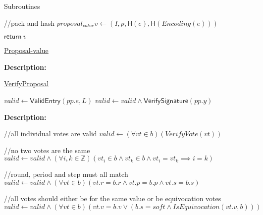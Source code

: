 \documentclass[10pt,a4paper]{article}
\begin{document}
\begin{section}{Subroutines}
\begin{algorithm}[H]
\begin{algorithmic}[1]
    //pack and hash
    \State $proposal_{value} v \gets (I, p, \mathsf{H}(e), \mathsf{H}(Encoding(e)))$

    \State $\mathsf{return} \ v$

    \EndFunction
    \end{algorithmic}
    \caption{\underline{Proposal-value}}
\end{algorithm}

\noindent \textbf{Description:}\\ 


\begin{algorithm}[H]
    \caption{\underline{VerifyProposal}}
    \label{algo:verify-proposal}
    \begin{algorithmic}[1]

    \State $valid \gets \mathsf{ValidEntry}(pp.e, L)$
    \State $valid \gets valid \land \mathsf{VerifySignature}(pp.y)$

    \EndFunction
    \end{algorithmic}
\end{algorithm}

\noindent \textbf{Description:}\\


\begin{algorithm}[H]\label{algo:verify-bundle}
    \begin{algorithmic}[1]

    //all individual votes are valid
    \State $valid \gets (\forall vt \in b)(VerifyVote(vt))$
    
    //no two votes are the same
    \State $valid \gets valid \land (\forall i,k \in \mathbb{Z})(vt_i \in b \land vt_k \in b \land vt_i = vt_k \implies i=k)$

    //round, period and step must all match
    \State $valid \gets valid \land (\forall vt \in b)(vt.r = b.r \land vt.p = b.p \land vt.s = b.s)$
  
    //all votes should either be for the same value or be equivocation votes
    \State $valid \gets valid \land (\forall vt \in b)(vt.v = b.v \lor (b.s = soft \land IsEquivocation(vt.v, b)))$


\end{algorithmic}
\end{algorithm}
\end{section}
\end{document}
